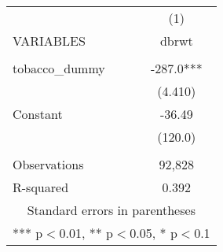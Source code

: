 \begin{tabular}{lc} \hline
 & (1) \\
VARIABLES & dbrwt \\ \hline
 &  \\
tobacco\_dummy & -287.0*** \\
 & (4.410) \\
Constant & -36.49 \\
 & (120.0) \\
 &  \\
Observations & 92,828 \\
 R-squared & 0.392 \\ \hline
\multicolumn{2}{c}{ Standard errors in parentheses} \\
\multicolumn{2}{c}{ *** p$<$0.01, ** p$<$0.05, * p$<$0.1} \\
\end{tabular}
